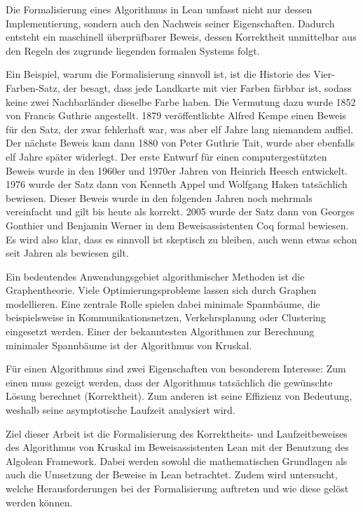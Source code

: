 Die Formalisierung eines Algorithmus in Lean umfasst nicht nur dessen Implementierung, sondern auch den Nachweis seiner Eigenschaften.
Dadurch entsteht ein maschinell überprüfbarer Beweis, dessen Korrektheit unmittelbar aus den Regeln des zugrunde liegenden formalen Systems folgt.

Ein Beispiel, warum die Formalisierung sinnvoll ist, ist die Historie des Vier-Farben-Satz\cite{vier_farben_wiki}, der besagt,
dass jede Landkarte mit vier Farben färbbar ist, sodass keine zwei Nachbarländer dieselbe Farbe haben.
Die Vermutung dazu wurde 1852 von Francis Guthrie angestellt.
1879 veröffentlichte Alfred Kempe einen Beweis für den Satz, der zwar fehlerhaft war, was aber elf Jahre lang niemandem auffiel.
Der nächste Beweis kam dann 1880 von Peter Guthrie Tait, wurde aber ebenfalls elf Jahre später widerlegt.
Der erste Entwurf für einen computergestützten Beweis wurde in den 1960er und 1970er Jahren von Heinrich Heesch entwickelt.
1976 wurde der Satz dann von Kenneth Appel und Wolfgang Haken tatsächlich bewiesen.
Dieser Beweis wurde in den folgenden Jahren noch mehrmals vereinfacht und gilt bis heute als korrekt.
2005 wurde der Satz dann von Georges Gonthier und Benjamin Werner in dem Beweisassistenten Coq formal bewiesen\cite{vier_farben_paper}.
Es wird also klar, dass es sinnvoll ist skeptisch zu bleiben, auch wenn etwas schon seit Jahren als bewiesen gilt.

Ein bedeutendes Anwendungsgebiet algorithmischer Methoden ist die Graphentheorie.
Viele Optimierungsprobleme lassen sich durch Graphen modellieren.
Eine zentrale Rolle spielen dabei minimale Spannbäume, die beispielsweise in Kommunikationsnetzen, Verkehrsplanung oder Clustering eingesetzt werden. %
Einer der bekanntesten Algorithmen zur Berechnung minimaler Spannbäume ist der Algorithmus von Kruskal.

Für einen Algorithmus sind zwei Eigenschaften von besonderem Interesse: Zum einen muss gezeigt werden, dass der Algorithmus tatsächlich die gewünschte Lösung berechnet (Korrektheit).
Zum anderen ist seine Effizienz von Bedeutung, weshalb seine asymptotische Laufzeit analysiert wird.

Ziel dieser Arbeit ist die Formalisierung des Korrektheits- und Laufzeitbeweises des Algorithmus von Kruskal im Beweisassistenten Lean mit der Benutzung des Algolean Framework.
Dabei werden sowohl die mathematischen Grundlagen als auch die Umsetzung der Beweise in Lean betrachtet.
Zudem wird untersucht, welche Herausforderungen bei der Formalisierung auftreten und wie diese gelöst werden können.
